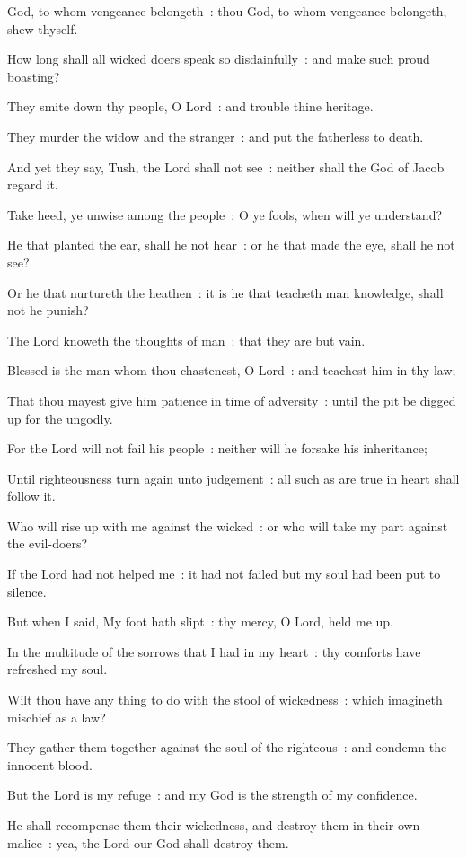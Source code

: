  God, to whom vengeance belongeth~: thou God, to whom vengeance belongeth, shew thyself.\par
{}
How long shall all wicked doers speak so disdainfully~: and make such proud boasting?\par
{}They smite down thy people, O Lord~: and trouble thine heritage.\par
{}They murder the widow and the stranger~: and put the fatherless to death.\par
{}And yet they say, Tush, the Lord shall not see~: neither shall the God of Jacob regard it.\par
{}Take heed, ye unwise among the people~: O ye fools, when will ye understand?\par
{}He that planted the ear, shall he not hear~: or he that made the eye, shall he not see?\par
{}Or he that nurtureth the heathen~: it is he that teacheth man knowledge, shall not he punish?\par
{}The Lord knoweth the thoughts of man~: that they are but vain.\par
{}Blessed is the man whom thou chastenest, O Lord~: and teachest him in thy law;\par
{}That thou mayest give him patience in time of adversity~: until the pit be digged up for the ungodly.\par
{}For the Lord will not fail his people~: neither will he forsake his inheritance;\par
{}Until righteousness turn again unto judgement~: all such as are true in heart shall follow it.\par
{}Who will rise up with me against the wicked~: or who will take my part against the evil-doers?\par
{}If the Lord had not helped me~: it had not failed but my soul had been put to silence.\par
{}But when I said, My foot hath slipt~: thy mercy, O Lord, held me up.\par
{}In the multitude of the sorrows that I had in my heart~: thy comforts have refreshed my soul.\par
{}Wilt thou have any thing to do with the stool of wickedness~: which imagineth mischief as a law?\par
{}They gather them together against the soul of the righteous~: and condemn the innocent blood.\par
{}But the Lord is my refuge~: and my God is the strength of my confidence.\par
{}He shall recompense them their wickedness, and destroy them in their own malice~: yea, the Lord our God shall destroy them.\par

